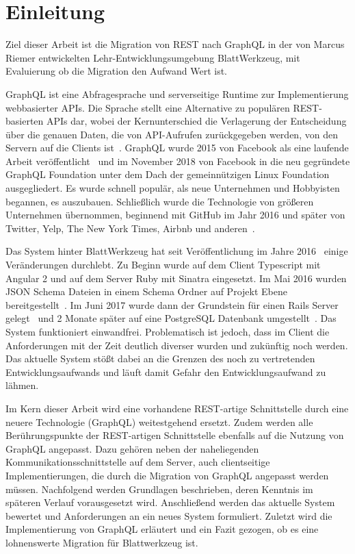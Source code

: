 
\chapter{Einleitung}
\label{sec:introduction}
 
Ziel dieser Arbeit ist die Migration von REST nach GraphQL in der von Marcus Riemer entwickelten Lehr-Entwicklungsumgebung BlattWerkzeug, mit Evaluierung ob die Migration den Aufwand Wert ist. 

GraphQL ist eine Abfragesprache und serverseitige Runtime zur Implementierung webbasierter APIs. Die Sprache
stellt eine Alternative zu populären REST-basierten APIs dar, wobei der Kernunterschied die
Verlagerung der Entscheidung über die genauen Daten, die von API-Aufrufen zurückgegeben werden, von den Servern auf die Clients ist~\cite{introduction}.
GraphQL wurde 2015 von Facebook als eine laufende Arbeit veröffentlicht~\cite{graphql-first-commit} und im November 2018 von Facebook in die neu gegründete GraphQL Foundation unter dem Dach der gemeinnützigen Linux Foundation ausgegliedert. Es wurde schnell populär, als neue Unternehmen und Hobbyisten begannen, es auszubauen. Schließlich wurde die Technologie von größeren Unternehmen übernommen, beginnend mit GitHub im Jahr 2016 und später von Twitter, Yelp, The New York Times, Airbnb und anderen~\cite{graphql-users}.

Das System hinter BlattWerkzeug hat seit Veröffentlichung im Jahre 2016~\cite{riemer2016} einige Veränderungen durchlebt. Zu Beginn wurde auf dem Client Typescript mit Angular 2 und auf dem Server Ruby mit Sinatra eingesetzt. Im Mai 2016 wurden JSON Schema Dateien in einem Schema Ordner auf Projekt Ebene bereitgestellt~\cite{riemerJSONSchemaCommit}.
Im Juni 2017 wurde dann der Grundstein für einen Rails Server gelegt~\cite{riemerRailsCommit} und 2 Monate später auf eine PostgreSQL Datenbank umgestellt~\cite{riemerPostgresCommit}. 
Das System funktioniert einwandfrei. Problematisch ist jedoch, dass im Client die Anforderungen mit der Zeit deutlich diverser wurden und zukünftig noch werden. 
Das aktuelle System stößt dabei an die Grenzen des noch zu vertretenden Entwicklungsaufwands und läuft damit Gefahr den Entwicklungsaufwand zu lähmen.

Im Kern dieser Arbeit wird eine vorhandene REST-artige Schnittstelle durch eine neuere Technologie (GraphQL) weitestgehend ersetzt. Zudem werden alle Berührungspunkte der REST-artigen Schnittstelle ebenfalls auf die Nutzung von GraphQL angepasst. Dazu gehören neben der naheliegenden Kommunikationsschnittstelle auf dem Server, auch clientseitige Implementierungen, die durch die Migration von GraphQL angepasst werden müssen. 
Nachfolgend werden Grundlagen beschrieben, deren Kenntnis im späteren Verlauf vorausgesetzt wird. Anschließend werden das aktuelle System bewertet und Anforderungen an ein neues System formuliert. 
Zuletzt wird die Implementierung von GraphQL
erläutert und ein Fazit gezogen, ob es eine lohnenswerte Migration für Blattwerkzeug ist.
 

